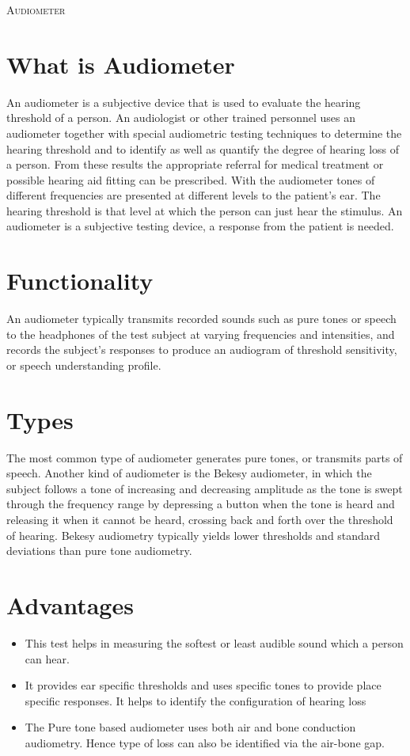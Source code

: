 \documentclass[11pt]{article}
\begin{document}
\clearpage
\newpage

\textsc{\LARGE Audiometer}\\[1.5cm]
\section*{What is Audiometer}
An audiometer is a subjective device that is used to evaluate the hearing threshold of a person. An audiologist or other trained personnel uses an audiometer together with special audiometric testing techniques to determine the hearing threshold and to identify as well as quantify the degree of hearing loss of a person. From these results the appropriate referral for medical treatment or possible hearing aid fitting can be prescribed. With the audiometer tones of different frequencies are presented at different levels to the patient’s ear. The hearing threshold is that level at which the person can just hear the stimulus. An audiometer is a subjective testing device, a response from the patient is needed.


\section*{Functionality}
An audiometer typically transmits recorded sounds such as pure tones or speech to the headphones of the test subject at varying frequencies and intensities, and records the subject's responses to produce an audiogram of threshold sensitivity, or speech understanding profile.

\section*{Types}
The most common type of audiometer generates pure tones, or transmits parts of speech. Another kind of audiometer is the Bekesy audiometer, in which the subject follows a tone of increasing and decreasing amplitude as the tone is swept through the frequency range by depressing a button when the tone is heard and releasing it when it cannot be heard, crossing back and forth over the threshold of hearing. Bekesy audiometry typically yields lower thresholds and standard deviations than pure tone audiometry.
\section*{Advantages}

\begin{itemize}
\item This test helps in measuring the softest or least audible sound which a person can hear.
\item It provides ear specific thresholds and uses specific tones to provide place specific responses. It helps to identify the configuration of hearing loss
\item The Pure tone based audiometer uses both air and bone conduction audiometry. Hence type of loss can also be identified via the air-bone gap.


\end{itemize}
\end{document}
